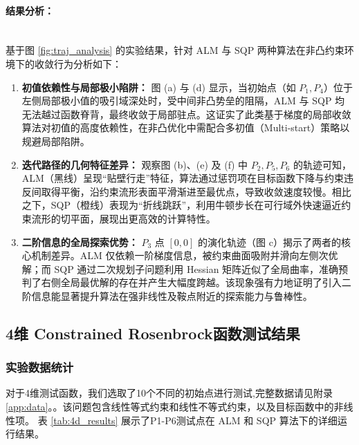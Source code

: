 \documentclass[a4paper,12pt]{article}
\begin{document}
\paragraph{结果分析：} \mbox{} \\

基于图 \ref{fig:traj_analysis} 的实验结果，针对 ALM 与 SQP 两种算法在非凸约束环境下的收敛行为分析如下：

\begin{enumerate}
    \item \textbf{初值依赖性与局部极小陷阱：}
    图 (a) 与 (d) 显示，当初始点（如 $P_1, P_4$）位于左侧局部极小值的吸引域深处时，受中间非凸势垒的阻隔，ALM 与 SQP 均无法越过函数脊背，最终收敛于局部驻点。这证实了此类基于梯度的局部收敛算法对初值的高度依赖性，在非凸优化中需配合多初值（Multi-start）策略以规避局部陷阱。

    \item \textbf{迭代路径的几何特征差异：}
    观察图 (b)、(e) 及 (f) 中 $P_2, P_5, P_6$ 的轨迹可知，ALM（黑线）呈现“贴壁行走”特征，算法通过惩罚项在目标函数下降与约束违反间取得平衡，沿约束流形表面平滑渐进至最优点，导致收敛速度较慢。相比之下，SQP（橙线）表现为“折线跳跃”，利用牛顿步长在可行域外快速逼近约束流形的切平面，展现出更高效的计算特性。

    \item \textbf{二阶信息的全局探索优势：}
    $P_3$ 点 $[0,0]$ 的演化轨迹（图 c）揭示了两者的核心机制差异。ALM 仅依赖一阶梯度信息，被约束曲面吸附并滑向左侧次优解；而 SQP 通过二次规划子问题利用 Hessian 矩阵近似了全局曲率，准确预判了右侧全局最优解的存在并产生大幅度跨越。该现象强有力地证明了引入二阶信息能显著提升算法在强非线性及鞍点附近的探索能力与鲁棒性。
\end{enumerate}


\subsection{4维 Constrained Rosenbrock函数测试结果}

\subsubsection{实验数据统计}

对于4维测试函数，我们选取了10个不同的初始点进行测试,完整数据请见附录 \ref{app:data}。。该问题包含线性等式约束和线性不等式约束，以及目标函数中的非线性项。
表 \ref{tab:4d_results} 展示了P1-P6测试点在 ALM 和 SQP 算法下的详细运行结果。
\end{document}

